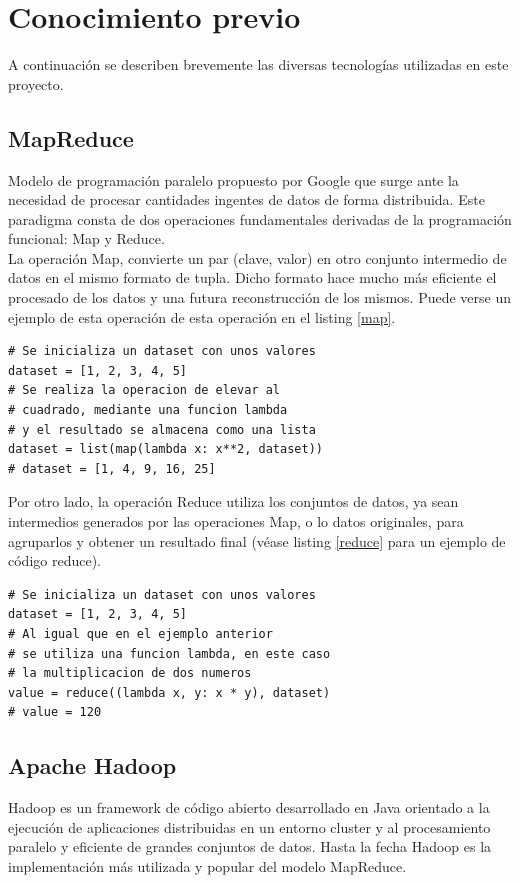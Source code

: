 \documentclass[conference]{IEEEtran}
\begin{document}
\section{Conocimiento previo}

A continuación se describen brevemente las diversas tecnologías utilizadas en este proyecto.

\subsection{MapReduce}
Modelo de programación paralelo propuesto por Google\cite{mapreduce} que surge ante la necesidad de procesar cantidades ingentes de datos de forma distribuida. Este paradigma consta de dos operaciones fundamentales derivadas de la programación funcional: Map y Reduce.\\

La operación Map, convierte un par (clave, valor) en otro conjunto intermedio de datos en el mismo formato de tupla. Dicho formato hace mucho más eficiente el procesado de los datos y una futura reconstrucción de los mismos. Puede verse un ejemplo de esta operación de esta operación en el listing \ref{map}.\\

\begin{lstlisting}[style=pythonStyle, caption=Ejemplo de operación Map, label=map]
# Se inicializa un dataset con unos valores
dataset = [1, 2, 3, 4, 5]
# Se realiza la operacion de elevar al 
# cuadrado, mediante una funcion lambda
# y el resultado se almacena como una lista
dataset = list(map(lambda x: x**2, dataset))
# dataset = [1, 4, 9, 16, 25]
\end{lstlisting}

Por otro lado, la operación Reduce utiliza los conjuntos de datos, ya sean intermedios generados por las operaciones Map, o lo datos originales, para agruparlos y obtener un resultado final (véase listing \ref{reduce} para un ejemplo de código reduce).

\begin{lstlisting}[style=pythonStyle, caption=Ejemplo de operación Reduce, label=reduce]
# Se inicializa un dataset con unos valores
dataset = [1, 2, 3, 4, 5]
# Al igual que en el ejemplo anterior 
# se utiliza una funcion lambda, en este caso
# la multiplicacion de dos numeros
value = reduce((lambda x, y: x * y), dataset)
# value = 120
\end{lstlisting}

\subsection{Apache Hadoop}
Hadoop \cite{hadoop} es un framework de código abierto desarrollado en Java orientado a la ejecución de aplicaciones distribuidas en un entorno cluster y al procesamiento paralelo y eficiente de grandes conjuntos de datos. Hasta la fecha Hadoop es la implementación más utilizada y popular del modelo MapReduce.
\end{document}
